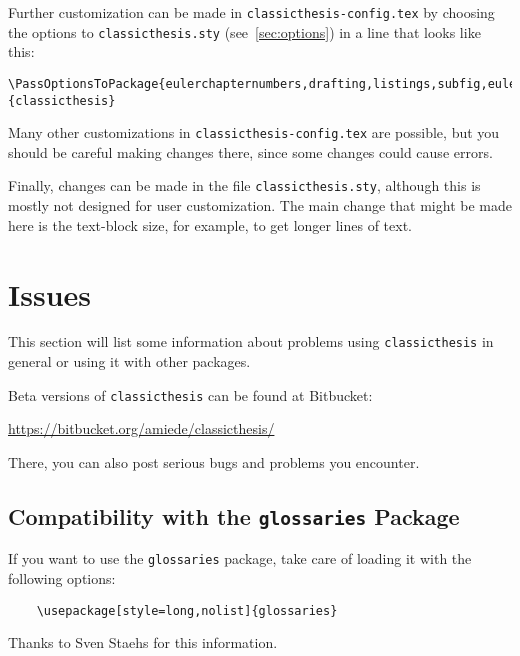 Further customization can be made in \texttt{classicthesis-config.tex}
by choosing the options to \texttt{classicthesis.sty} 
(see~\autoref{sec:options}) in a line that looks like this:

\begin{lstlisting}[frame=lt]
\PassOptionsToPackage{eulerchapternumbers,drafting,listings,subfig,eulermath,parts}{classicthesis}
\end{lstlisting}


Many other customizations in \texttt{classicthesis-config.tex} are
possible, but you should be careful making changes there, since some
changes could cause errors.

Finally, changes can be made in the file \texttt{classicthesis.sty},%
 although this is mostly not designed for user customization. The
main change that might be made here is the text-block size, for example,
to get longer lines of text.


\section{Issues}\label{sec:issues}
This section will list some information about problems using
\texttt{classic\-thesis} in general or using it with other packages.

Beta versions of \texttt{classicthesis} can be found at Bitbucket:
\begin{center}
	\url{https://bitbucket.org/amiede/classicthesis/}
\end{center}
There, you can also post serious bugs and problems you encounter.

\subsection*{Compatibility with the \texttt{glossaries} Package}
If you want to use the \texttt{glossaries} package, take care of loading it 
with the following options:
\begin{verbatim}
	\usepackage[style=long,nolist]{glossaries}
\end{verbatim}
Thanks to Sven Staehs for this information. 


